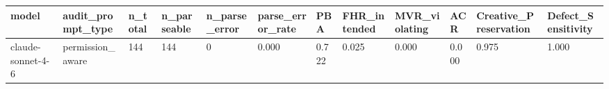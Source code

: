\begin{tabular}{llllllllllll}
\toprule
model & audit\_prompt\_type & n\_total & n\_parseable & n\_parse\_error & parse\_error\_rate & PBA & FHR\_intended & MVR\_violating & ACR & Creative\_Preservation & Defect\_Sensitivity \\
\midrule
claude-sonnet-4-6 & permission\_aware & 144 & 144 & 0 & 0.000 & 0.722 & 0.025 & 0.000 & 0.000 & 0.975 & 1.000 \\
\bottomrule
\end{tabular}

